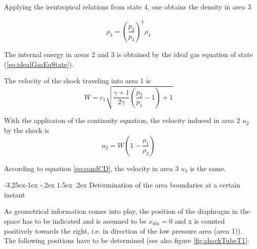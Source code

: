 \documentclass{report}
\makeatletter
\renewcommand\paragraph{\@startsection{paragraph}{4}{\z@}%
  {-3.25ex\@plus -1ex \@minus -.2ex}%
  {1.5ex \@plus .2ex}%
  {\normalfont\normalsize\bfseries}}
\makeatother
\begin{document}
Applying the isentropical relations from state 4, one obtains the density in area 3

\begin{equation}
\rho_3=\left(\frac{p_3}{p_4}\right)^{\frac{1}{\gamma}}\rho_4
\end{equation}

The internal energy in areas 2 and 3 is obtained by the ideal gas equation of state (\ref{eq:idealGasEqState}).

The velocity of the shock traveling into area 1 is
\begin{equation}
\label{eq:shockVelocity}
W=c_1\sqrt{\frac{\gamma+1}{2\gamma}\left(\frac{p_2}{p_1}-1\right)+1}
\end{equation}

With the applicaton of the continuity equation, the velocity induced in area 2 $u_2$ by the shock is
\begin{equation}
 u_2=W\left(1-\frac{\rho_1}{\rho_2}\right)
\end{equation}

According to equation \ref{eq:condCD}, the velocity in area 3 $u_3$ is the same.

\paragraph{Determination of the area boundaries at a certain instant}

As geometrical information comes into play, the position of the diaphragm in the space has to be indicated and is assumed to be $x_{dia}=0$ and x is counted positively towards the right, i.e. in direction of the low pressure area (area 1)).
The following positions have to be determined (see also figure \ref{fig:shockTubeT1}:
\end{document}
